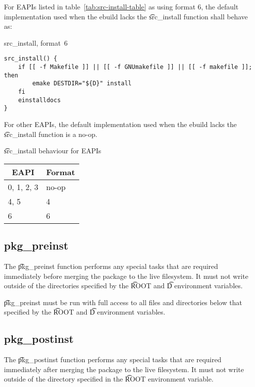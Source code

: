  For EAPIs listed in table~\ref{tab:src-install-table} as using format
6, the default implementation used when the ebuild lacks the \t{src\_install} function shall behave
as:

\begin{listing}[H]
\caption{src\_install, format~6}
\begin{verbatim}
src_install() {
    if [[ -f Makefile ]] || [[ -f GNUmakefile ]] || [[ -f makefile ]]; then
        emake DESTDIR="${D}" install
    fi
    einstalldocs
}
\end{verbatim}
\end{listing}

For other EAPIs, the default implementation used when the ebuild lacks the \t{src\_install} function
is a no-op.

\begin{centertable}{\t{src\_install} behaviour for EAPIs}
    \label{tab:src-install-table}
    \begin{tabular}{ll}
      \toprule
      \multicolumn{1}{c}{\textbf{EAPI}} &
      \multicolumn{1}{c}{\textbf{Format}} \\
      \midrule
      0, 1, 2, 3        & no-op \\
      4, 5              & 4     \\
      6                 & 6     \\
      \bottomrule
    \end{tabular}
\end{centertable}

\subsection{pkg\_preinst}

The \t{pkg\_preinst} function performs any special tasks that are required immediately before
merging the package to the live filesystem. It must not write outside of the directories specified
by the \t{ROOT} and \t{D} environment variables.

\t{pkg\_preinst} must be run with full access to all files and directories below that specified by
the \t{ROOT} and \t{D} environment variables.

\subsection{pkg\_postinst}

The \t{pkg\_postinst} function performs any special tasks that are required immediately after
merging the package to the live filesystem. It must not write outside of the directory specified
in the \t{ROOT} environment variable.

